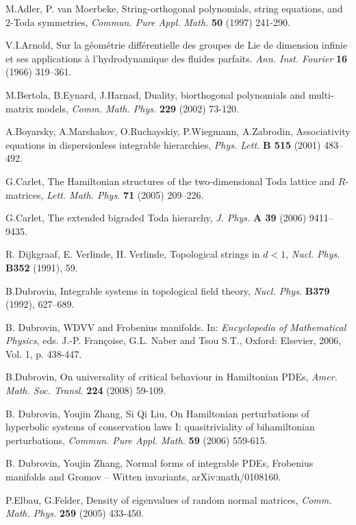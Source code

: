 \documentclass[numbook, envcountsame, envcountreset]{svjour3}
\begin{document}
\begin{thebibliography}{99}

 M.Adler, P. van Moerbeke, String-orthogonal polynomials, string equations, and 2-Toda symmetries, {\it Commun. Pure Appl. Math.} {\bf 50} (1997) 241-290.

 V.I.Arnold, Sur la g\'eom\'etrie diff\'erentielle des groupes de Lie de dimension infinie et ses applications \`a l'hydrodynamique des fluides parfaits. {\it Ann. Inst. Fourier}  {\bf 16} (1966) 319--361.

 M.Bertola, B.Eynard, J.Harnad, Duality, biorthogonal polynomials and multi-matrix models, {\it Comm. Math. Phys.} {\bf 229} (2002) 73-120.

 A.Boyarsky,  A.Marshakov, O.Ruchayskiy, P.Wiegmann, A.Zabrodin,
Associativity equations in dispersionless integrable hierarchies, 
{\it Phys. Lett.} {\bf B 515} (2001) 483--492. 

 G.Carlet, The Hamiltonian structures of the two-dimensional Toda lattice and $R$-matrices, {\it Lett. Math. Phys.} {\bf 71} (2005) 209--226.

 G.Carlet, The extended bigraded Toda hierarchy, {\it J. Phys.} {\bf A 39} (2006) 9411--9435.

 R. Dijkgraaf, E. Verlinde, H. Verlinde, Topological
strings in $d<1$,
{\it Nucl. Phys.} {\bf B352} (1991), 59.

 B.Dubrovin, Integrable systems in topological
field theory, {\it Nucl. Phys.} {\bf B379} (1992), 627--689.

 B. Dubrovin, WDVV and Frobenius manifolds. In: {\it Encyclopedia of Mathematical Physics}, eds. J.-P. Fran\c coise, G.L. Naber and
Tsou S.T.,  Oxford: Elsevier, 2006, Vol. 1, p. 438-447.

 B.Dubrovin, On universality of critical behaviour in Hamiltonian PDEs, 
{\it Amer. Math. Soc. Transl.} {\bf 224} (2008) 59-109.

 B. Dubrovin, Youjin Zhang, Si Qi Liu, On Hamiltonian perturbations of hyperbolic systems of conservation laws I: quasitriviality of bihamiltonian perturbations, {\it Commun. Pure Appl. Math.} {\bf 59} (2006) 559-615.

 B. Dubrovin, Youjin Zhang, Normal forms of integrable PDEs, Frobenius manifolds
and Gromov -- Witten invariants,
arXiv:math/0108160.

 P.Elbau, G.Felder, Density of eigenvalues of random normal matrices, {\it Comm. Math. Phys.} {\bf 259} (2005) 433-450.


\end{thebibliography}
\end{document}
